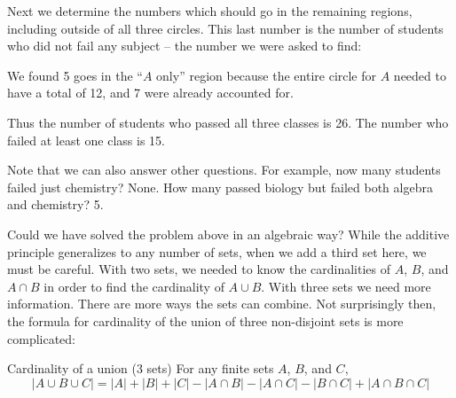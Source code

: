 \documentclass[12pt]{article}
\begin{document}
\begin{example}
\begin{solution}
\begin{center}
\end{center}

Next we determine the numbers which should go in the remaining regions, including outside of all three circles.  This last number is the number of students who did not fail any subject -- the number we were asked to find:

\begin{center}
\end{center}

We found 5 goes in the ``$A$ only'' region because the entire circle for $A$ needed to have a total of 12, and 7 were already accounted for.  

Thus the number of students who passed all three classes is 26.  The number who failed at least one class is 15.

Note that we can also answer other questions.  For example, now many students failed just chemistry?  None.  How many passed biology but failed both algebra and chemistry? 5.

 \end{solution}
\end{example} 
 
Could we have solved the problem above in an algebraic way?  While the additive principle generalizes to any number of sets, when we add a third set here, we must be careful. With two sets, we needed to know the cardinalities of $A$, $B$, and $A \cap B$ in order to find the cardinality of $A \cup B$.  With three sets we need more information.  There are more ways the sets can combine.  Not surprisingly then, the formula for cardinality of the union of three non-disjoint sets is more complicated:


\begin{defbox}{Cardinality of a union (3 sets)}
  For any finite sets $A$, $B$, and $C$,
  \[|A \cup B \cup C| = |A| + |B| + |C| - |A \cap B| - |A \cap C| - |B \cap C| + |A \cap B \cap C|\]
\end{defbox}
\end{document}
